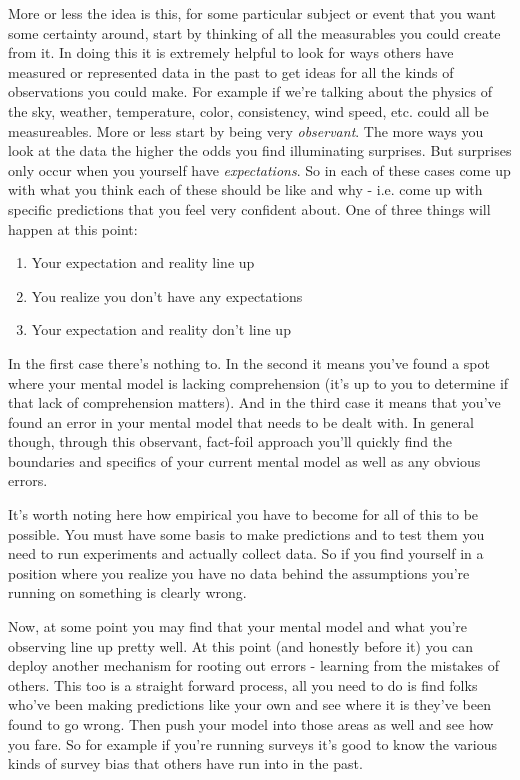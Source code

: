 \documentclass[11pt,a5paper]{book}
\begin{document}
More or less the idea is this, for some particular subject or event that you want some certainty around, start by thinking of all the measurables you could create from it. In doing this it is extremely helpful to look for ways others have measured or represented data in the past to get ideas for all the kinds of observations you could make. For example if we're talking about the physics of the sky, weather, temperature, color, consistency, wind speed, etc. could all be measureables. More or less start by being very \textit{observant}. The more ways you look at the data the higher the odds you find illuminating surprises. But surprises only occur when you yourself have \textit{expectations}. So in each of these cases come up with what you think each of these should be like and why - i.e. come up with specific predictions that you feel very confident about. One of three things will happen at this point:

\begin{enumerate}
\item Your expectation and reality line up
\item You realize you don't have any expectations
\item Your expectation and reality don't line up
\end{enumerate} 

In the first case there's nothing to. In the second it means you've found a spot where your mental model is lacking comprehension (it's up to you to determine if that lack of comprehension matters). And in the third case it means that you've found an error in your mental model that needs to be dealt with. In general though, through this observant, fact-foil \cite{lipton} approach you'll quickly find the boundaries and specifics of your current mental model as well as any obvious errors.
\newline 

It's worth noting here how empirical you have to become for all of this to be possible. You must have some basis to make predictions and to test them you need to run experiments and actually collect data. So if you find yourself in a position where you realize you have no data behind the assumptions you're running on something is clearly wrong.
\newline

Now, at some point you may find that your mental model and what you're observing line up pretty well. At this point (and honestly before it) you can deploy another mechanism for rooting out errors - learning from the mistakes of others. This too is a straight forward process, all you need to do is find folks who've been making predictions like your own and see where it is they've been found to go wrong. Then push your model into those areas as well and see how you fare. So for example if you're running surveys it's good to know the various kinds of survey bias that others have run into in the past.  
\newline
\end{document}
